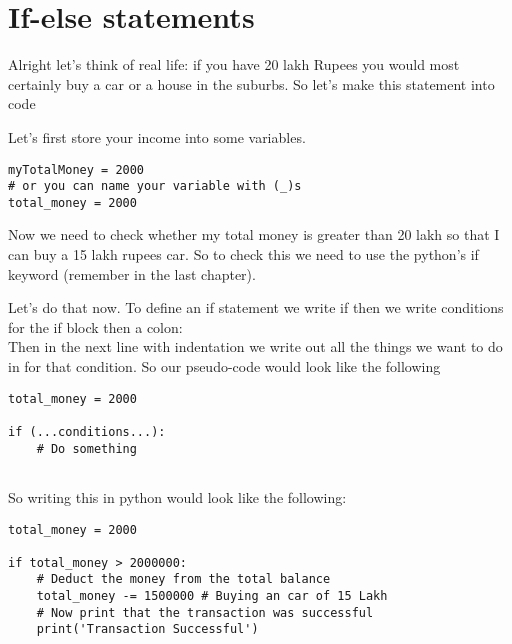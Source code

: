 \chapter{If-else statements}
Alright let's think of real life: if you have 20 lakh Rupees you would most certainly buy a car or a house in the suburbs. So let's make this statement into code

\noindent Let's first store your income into some variables.

\noindent\begin{minipage}{\linewidth}
\begin{lstlisting}[style=python]
myTotalMoney = 2000
# or you can name your variable with (_)s
total_money = 2000
\end{lstlisting}
\end{minipage}

Now we need to check whether my total money is greater than 20 lakh so that I can buy a 15 lakh rupees car.
So to check this we need to use the python's if keyword (remember in the last chapter).

Let's do that now. To define an if statement we write if then we write conditions for the if block then a colon:\\
\noindent Then in the next line with indentation we write out all the things we want to do in for that condition. So our pseudo-code would look like the following

\noindent\begin{minipage}{\linewidth}
\begin{lstlisting}[style=python]
total_money = 2000

if (...conditions...):
    # Do something
    
\end{lstlisting}
\end{minipage}

\noindent So writing this in python would look like the following:

\noindent\begin{minipage}{\linewidth}
\begin{lstlisting}[style=python]
total_money = 2000

if total_money > 2000000:
    # Deduct the money from the total balance
    total_money -= 1500000 # Buying an car of 15 Lakh
    # Now print that the transaction was successful
    print('Transaction Successful')
\end{lstlisting}
\end{minipage}

